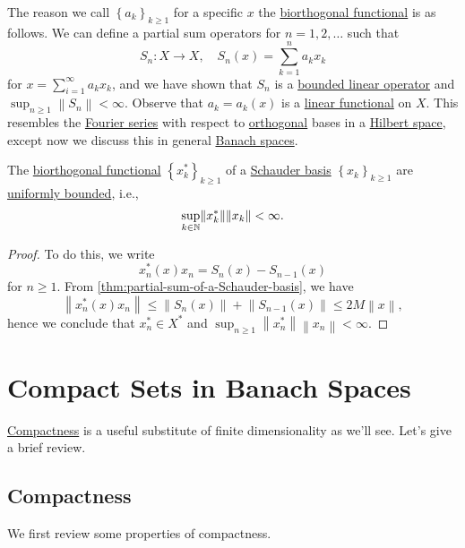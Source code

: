 The reason we call \(\left\{ a_k \right\} _{k\geq 1}\) for a specific \(x\) the \hyperref[def:biorthogonal-functional]{biorthogonal functional} is as follows. We can define a partial sum operators for \(n = 1, 2, \ldots  \) such that
\[
	S_n\colon X\to X,\quad S_n (x) = \sum\limits_{k=1}^{n} a_k x_k
\]
for \(x = \sum_{i=1}^{\infty }a_k x_k\), and we have shown that \(S_n\) is a \hyperref[def:bounded-linear-op]{bounded linear operator} and \(\sup _{n\geq 1} \left\lVert S_n\right\rVert < \infty \). Observe that \(a_k = a_k(x)\) is a \hyperref[def:linear-functional]{linear functional} on \(X\). This resembles the \hyperref[def:Fourier-series]{Fourier series} with respect to \hyperref[def:orthogonal-system]{orthogonal} bases in a \hyperref[def:Hilbert-space]{Hilbert space}, except now we discuss this in general \hyperref[def:Banach-space]{Banach spaces}.

\begin{proposition}
	The \hyperref[def:biorthogonal-functional]{biorthogonal functional} \(\left\{ x_k^{\ast} \right\} _{k\geq 1}\) of a \hyperref[def:Schauder-basis]{Schauder basis} \(\left\{ x_k \right\} _{k\geq 1}\) are \hyperref[def:uniformly-bounded]{uniformly bounded}, i.e.,
	\[
		\sup _{k\in \mathbb{\MakeUppercase{n}} }\lVert x_k ^{\ast}  \rVert \lVert x_{k}  \rVert < \infty .
	\]
\end{proposition}
\begin{proof}
	To do this, we write
	\[
		x_n^{\ast} (x) x_n = S_n(x) - S_{n-1}(x)
	\]
	for \(n \geq 1\). From \autoref{thm:partial-sum-of-a-Schauder-basis}, we have
	\[
		\left\lVert x^{\ast} _n(x)x_n\right\rVert \leq \left\lVert S_n(x)\right\rVert + \left\lVert S_{n-1}(x) \right\rVert \leq 2M \left\lVert x\right\rVert,
	\]
	hence we conclude that \(x_n^{\ast} \in X^{\ast} \) and \(\sup _{n\geq 1} \left\lVert x_n^{\ast} \right\rVert \left\lVert x_n\right\rVert < \infty \).
\end{proof}

\section{Compact Sets in Banach Spaces}
\hyperref[def:compact]{Compactness} is a useful substitute of finite dimensionality as we'll see. Let's give a brief review.
\subsection{Compactness}
We first review some properties of compactness.

